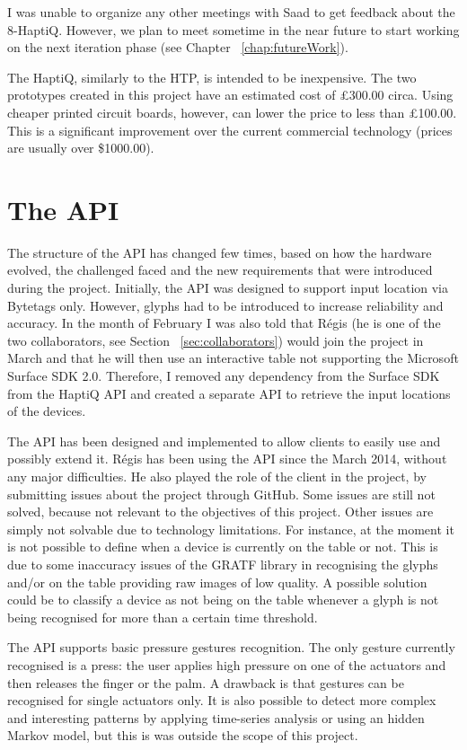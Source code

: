 I was unable to organize any other meetings with Saad to get feedback about the 8-HaptiQ. However, we plan to meet sometime in the near future to start working on the next iteration phase (see Chapter ~\ref{chap:futureWork}). 

The HaptiQ, similarly to the HTP, is intended to be inexpensive. The two prototypes created in this project have an estimated cost of £300.00 circa. Using cheaper printed circuit boards, however, can lower the price to less than £100.00. This is a significant improvement over the current commercial technology (prices are usually over \$1000.00).

\section{The API}

The structure of the API has changed few times, based on how the hardware evolved, the challenged faced and the new requirements that were introduced during the project. 
Initially, the API was designed to support input location via Bytetags only. However, glyphs had to be introduced to increase reliability and accuracy. In the month of February I was also told that Régis (he is one of the two collaborators, see Section ~\ref{sec:collaborators}) would join the project in March and that he will then use an interactive table not supporting the Microsoft Surface SDK 2.0. Therefore, I removed any dependency from the Surface SDK from the HaptiQ API and created a separate API to retrieve the input locations of the devices. 

The API has been designed and implemented to allow clients to easily use and possibly extend it. Régis has been using the API since the  March 2014, without any major difficulties. He also played the role of the client in the project, by submitting issues about the project through GitHub. Some issues are still not solved, because not relevant to the objectives of this project. Other issues are simply not solvable due to technology limitations. For instance, at the moment it is not possible to define when a device is currently on the table or not. This is due to some inaccuracy issues of the GRATF library in recognising the glyphs and/or on the table providing raw images of low quality. A possible solution could be to classify a device as not being on the table whenever a glyph is not being recognised for more than a certain time threshold. 

The API supports basic pressure gestures recognition. The only gesture currently recognised is a press: the user applies high pressure on one of the actuators and then releases the finger or the palm. A drawback is that gestures can be recognised for single actuators only. It is also possible to detect more complex and interesting patterns by applying time-series analysis or using an hidden Markov model, but this is was outside the scope of this project. 

